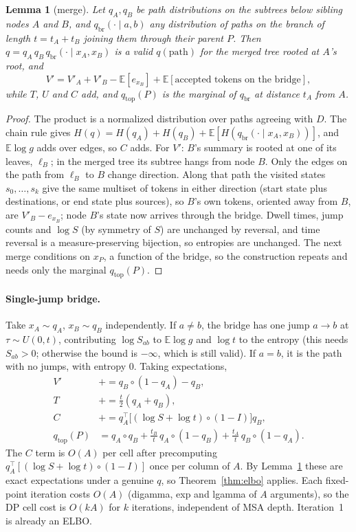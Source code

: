 \documentclass[11pt]{article}
\newtheorem{lemma}{Lemma}
\newcommand{\E}{\mathbb E}
\begin{document}
\begin{lemma}[merge]\label{lem:merge}
Let $q_A,q_B$ be path distributions on the subtrees below sibling nodes $A$ and
$B$, and $q_{\mathrm{br}}(\cdot\mid a,b)$ any distribution of paths on the
branch of length $t=t_A+t_B$ joining them through their parent $P$. Then
$q=q_A\,q_B\,q_{\mathrm{br}}(\cdot\mid x_A,x_B)$ is a valid $q(\text{path})$ for
the merged tree rooted at $A$'s root, and
\[
V'=V'_A+V'_B-\E[e_{x_B}]+\E[\text{accepted tokens on the bridge}],
\]
while $T$, $U$ and $C$ add, and $q_{\mathrm{top}}(P)$ is the marginal of
$q_{\mathrm{br}}$ at distance $t_A$ from $A$.
\end{lemma}
\begin{proof}
The product is a normalized distribution over paths agreeing with $D$. The
chain rule gives
$H(q)=H(q_A)+H(q_B)+\E[H(q_{\mathrm{br}}(\cdot\mid x_A,x_B))]$, and
$\E\log g$ adds over edges, so $C$ adds. For $V'$: $B$'s summary is rooted at
one of its leaves, $\ell_B$; in the merged tree its subtree hangs from node
$B$. Only the edges on the path from $\ell_B$ to $B$ change direction. Along
that path the visited states $s_0,\dots,s_k$ give the same multiset of tokens
in either direction (start state plus destinations, or end state plus
sources), so $B$'s own tokens, oriented away from $B$, are $V'_B-e_{x_B}$;
node $B$'s state now arrives through the bridge. Dwell times, jump counts and
$\log S$ (by symmetry of $S$) are unchanged by reversal, and time reversal is
a measure-preserving bijection, so entropies are unchanged. The next merge
conditions on $x_P$, a function of the bridge, so the construction repeats and
needs only the marginal $q_{\mathrm{top}}(P)$.
\end{proof}

\paragraph{Single-jump bridge.} Take $x_A\sim q_A$, $x_B\sim q_B$
independently. If $a\ne b$, the bridge has one jump $a\to b$ at
$\tau\sim U(0,t)$, contributing $\log S_{ab}$ to $\E\log g$ and $\log t$ to the
entropy (this needs $S_{ab}>0$; otherwise the bound is $-\infty$, which is
still valid). If $a=b$, it is the path with no jumps, with entropy $0$. Taking
expectations,
\begin{align*}
V'&\mathrel{+}=q_B\circ(1-q_A)-q_B,\\
T&\mathrel{+}=\tfrac t2(q_A+q_B),\\
C&\mathrel{+}=q_A^\top\big[(\log S+\log t)\circ(1-I)\big]q_B,\\
q_{\mathrm{top}}(P)&=q_A\circ q_B+\tfrac{t_B}{t}\,q_A\circ(1-q_B)
 +\tfrac{t_A}{t}\,q_B\circ(1-q_A).
\end{align*}
The $C$ term is $O(A)$ per cell after precomputing
$q_A^\top[(\log S+\log t)\circ(1-I)]$ once per column of $A$. By
Lemma~\ref{lem:merge} these are exact expectations under a genuine $q$, so
Theorem~\ref{thm:elbo} applies. Each fixed-point iteration costs $O(A)$
(digamma, exp and lgamma of $A$ arguments), so the DP cell cost is $O(kA)$ for
$k$ iterations, independent of MSA depth. Iteration~1 is already an ELBO.
\end{document}
